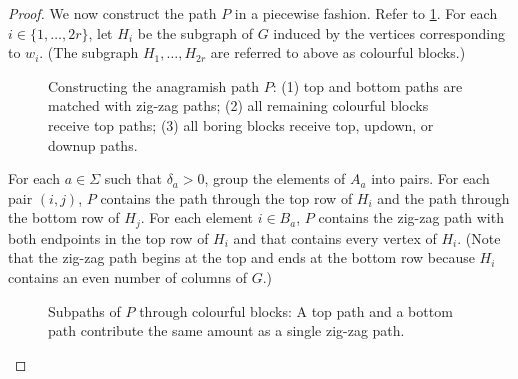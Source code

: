 \documentclass{patmorin}
\begin{document}
\begin{proof}
    We now construct the path $P$ in a piecewise fashion.  Refer to \cref{path_construction}.  For each $i\in\{1,\ldots,2r\}$, let $H_i$ be the subgraph of $G$ induced by the vertices corresponding to $w_i$. (The subgraph $H_1,\ldots,H_{2r}$ are referred to above as colourful blocks.)
    \begin{figure}
        \caption{Constructing the anagramish path $P$:
            (1) top and bottom paths are matched with zig-zag paths;
            (2) all remaining colourful blocks receive top paths;
            (3) all boring blocks receive top, updown, or downup paths.
        }
        \label{path_construction}
    \end{figure}
    \begin{compactenum}
        \item For each $a\in\Sigma$ such that $\delta_a>0$, group the elements of $A_a$ into pairs.  For each pair $(i,j)$, $P$ contains the path through the top row of $H_i$ and the path through the bottom row of $H_j$.  For each element $i\in B_a$, $P$ contains the zig-zag path with both endpoints in the top row of $H_i$ and that contains every vertex of $H_i$.  (Note that the zig-zag path begins at the top and ends at the bottom row because $H_i$ contains an even number of columns of $G$.)

        \begin{figure}
            \caption{Subpaths of $P$ through colourful blocks: A top path and a bottom path contribute the same amount as a single zig-zag path.}
        \end{figure}



\end{compactenum}
\end{proof}
\end{document}
